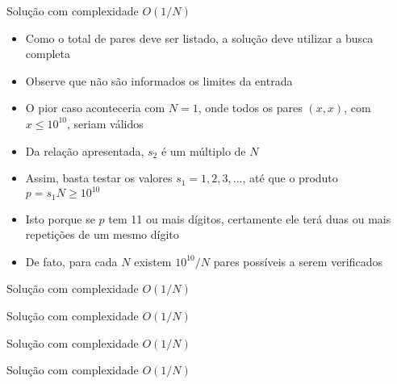 \begin{frame}[fragile]{Solução com complexidade $O(1/N)$}

    \begin{itemize}
        \item Como o total de pares deve ser listado, a solução deve utilizar a busca completa

        \item Observe que não são informados os limites da entrada

        \item O pior caso aconteceria com $N = 1$, onde todos os pares $(x, x)$, com $x \leq 
            10^{10}$, seriam válidos

        \item Da relação apresentada, $s_2$ é um múltiplo de $N$

        \item Assim, basta testar os valores $s_1 = 1, 2, 3, \ldots$, até que o produto
            $p = s_1N \geq 10^{10}$

        \item Isto porque se $p$ tem 11 ou mais dígitos, certamente ele terá duas ou mais repetições
            de um mesmo dígito

        \item De fato, para cada $N$ existem $10^{10}/N$ pares possíveis a serem verificados
   \end{itemize}

\end{frame}

\begin{frame}[fragile]{Solução com complexidade $O(1/N)$}
\end{frame}

\begin{frame}[fragile]{Solução com complexidade $O(1/N)$}
\end{frame}
\begin{frame}[fragile]{Solução com complexidade $O(1/N)$}
\end{frame}
\begin{frame}[fragile]{Solução com complexidade $O(1/N)$}
\end{frame}
